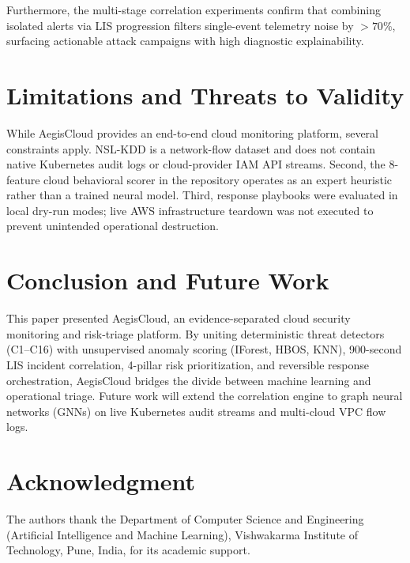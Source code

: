 \documentclass[conference]{IEEEtran}
\begin{document}
Furthermore, the multi-stage correlation experiments confirm that combining isolated alerts via LIS progression filters single-event telemetry noise by $>70\%$, surfacing actionable attack campaigns with high diagnostic explainability.

\section{Limitations and Threats to Validity}
While AegisCloud provides an end-to-end cloud monitoring platform, several constraints apply. NSL-KDD is a network-flow dataset and does not contain native Kubernetes audit logs or cloud-provider IAM API streams. Second, the 8-feature cloud behavioral scorer in the repository operates as an expert heuristic rather than a trained neural model. Third, response playbooks were evaluated in local dry-run modes; live AWS infrastructure teardown was not executed to prevent unintended operational destruction.

\section{Conclusion and Future Work}
This paper presented AegisCloud, an evidence-separated cloud security monitoring and risk-triage platform. By uniting deterministic threat detectors (C1--C16) with unsupervised anomaly scoring (IForest, HBOS, KNN), 900-second LIS incident correlation, 4-pillar risk prioritization, and reversible response orchestration, AegisCloud bridges the divide between machine learning and operational triage. Future work will extend the correlation engine to graph neural networks (GNNs) on live Kubernetes audit streams and multi-cloud VPC flow logs.

\section*{Acknowledgment}
The authors thank the Department of Computer Science and Engineering (Artificial Intelligence and Machine Learning), Vishwakarma Institute of Technology, Pune, India, for its academic support.
\end{document}
